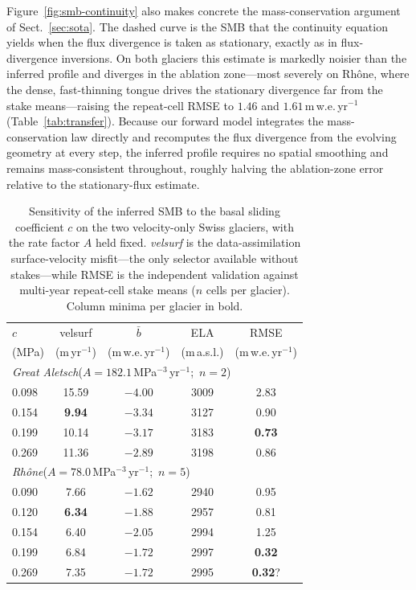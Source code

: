 Figure~\ref{fig:smb-continuity} also makes concrete the mass-conservation
argument of Sect.~\ref{sec:sota}. The dashed curve is the SMB that the continuity
equation yields when the flux divergence is taken as stationary, exactly as in
flux-divergence inversions. On both glaciers this estimate is markedly noisier
than the inferred profile and diverges in the ablation zone---most severely on
Rhône, where the dense, fast-thinning tongue drives the stationary divergence far
from the stake means---raising the repeat-cell RMSE to $1.46$ and $1.61$\,m\,w.e.\,yr$^{-1}$
(Table~\ref{tab:transfer}). Because our forward model integrates the
mass-conservation law directly and recomputes the flux divergence from the
evolving geometry at every step, the inferred profile requires no spatial
smoothing and remains mass-consistent throughout, roughly halving the
ablation-zone error relative to the stationary-flux estimate.

\begin{table}
  \caption{Sensitivity of the inferred SMB to the basal sliding coefficient $c$
    on the two velocity-only Swiss glaciers, with the rate factor $A$ held fixed.
    \emph{velsurf} is the data-assimilation surface-velocity misfit---the only
    selector available without stakes---while RMSE is the independent validation
    against multi-year repeat-cell stake means ($n$ cells per glacier). Column
    minima per glacier in bold.}
  \label{tab:sens}
  \centering
  \begin{tabular}{lcccc}
    \toprule
    $c$ & velsurf & $\bar{b}$ & ELA & RMSE \\
    (MPa) & (m\,yr$^{-1}$) & (m\,w.e.\,yr$^{-1}$) & (m\,a.s.l.) & (m\,w.e.\,yr$^{-1}$) \\
    \midrule
    \multicolumn{5}{l}{\textit{Great Aletsch}\quad($A=182.1$\,MPa$^{-3}$\,yr$^{-1}$;\ $n=2$)} \\
    0.098 & 15.59          & $-4.00$ & 3009 & 2.83 \\
    0.154 & \textbf{9.94}  & $-3.34$ & 3127 & 0.90 \\
    0.199 & 10.14          & $-3.17$ & 3183 & \textbf{0.73} \\
    0.269 & 11.36          & $-2.89$ & 3198 & 0.86 \\
    \midrule
    \multicolumn{5}{l}{\textit{Rhône}\quad($A=78.0$\,MPa$^{-3}$\,yr$^{-1}$;\ $n=5$)} \\
    0.090 & 7.66          & $-1.62$ & 2940 & 0.95 \\
    0.120 & \textbf{6.34} & $-1.88$ & 2957 & 0.81 \\
    0.154 & 6.40          & $-2.05$ & 2994 & 1.25 \\
    0.199 & 6.84          & $-1.72$ & 2997 & \textbf{0.32} \\
    0.269 & 7.35          & $-1.72$ & 2995 & \textbf{0.32}? \\ %
    \bottomrule
  \end{tabular}
\end{table}


